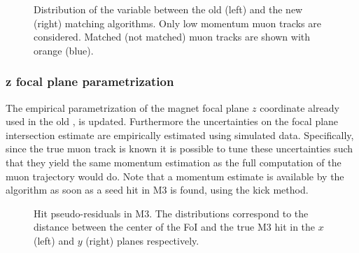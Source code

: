 \begin{figure}[t]
  \centering
  \begin{subfigure}{0.5\textwidth}
    \raggedright
    \scalebox{.55}{}
    \caption{}
    \label{mvTTm_chi2}
  \end{subfigure}%
  \hfill%
  \begin{subfigure}{0.5\textwidth}
    \raggedleft
    \scalebox{.55}{}
    \caption{}
    \label{mvm_chi2}
  \end{subfigure}
  \caption{Distribution of the \chisq variable between the old (left) and the new (right) matching algorithms.
           Only low momentum muon tracks are considered. Matched (not matched) muon tracks are shown with orange (blue).}
 \label{mvm_chi2_comp}
\end{figure}

\subsubsection{z focal plane parametrization}
The empirical parametrization of the magnet focal plane $z$ coordinate already used in the old \mvm \cite{roelThesis},
is updated. Furthermore the uncertainties on the focal plane intersection estimate are empirically estimated using simulated data.
Specifically, since the true muon track is known it is possible to tune these uncertainties such that they yield the same momentum
estimation as the full computation of the muon trajectory would do. Note that a momentum estimate is available by the
\mvTTm algorithm as soon as a seed hit in M3 is found, using the kick method.

\begin{figure}[t]
  \centering
  \begin{subfigure}{0.5\textwidth}
    \raggedright
    \scalebox{.55}{}
    \caption{}
    \label{mvTTm_res_x}
  \end{subfigure}%
  \hfill%
  \begin{subfigure}{0.5\textwidth}
    \raggedleft
    \scalebox{.55}{}
    \caption{}
    \label{mvm_res_y}
  \end{subfigure}
  \caption{Hit pseudo-residuals in M3. The distributions correspond to the distance between the center of the FoI and the true M3 hit
           in the $x$ (left) and $y$ (right) planes respectively.}
 \label{mvm_res}
\end{figure}

